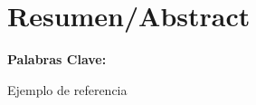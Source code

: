 \chapter{Resumen/Abstract}

\textbf{Palabras Clave:}

Ejemplo de referencia \cite{maubert2009fundamentos}